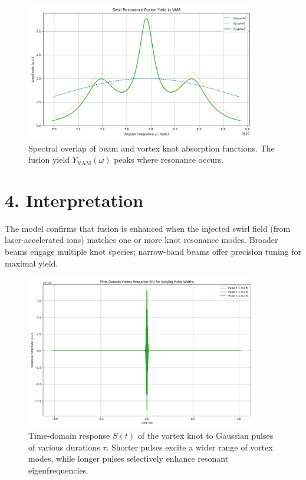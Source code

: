 \documentclass{article}
\begin{document}
\begin{figure}[h!]
  \centering
  \includegraphics[width=0.9\textwidth]{images/vam_swirl_yield_plot}
  \caption{Spectral overlap of beam and vortex knot absorption functions. The fusion yield $Y_{\mathrm{VAM}}(\omega)$ peaks where resonance occurs.}
\end{figure}

\section*{4. Interpretation}
The model confirms that fusion is enhanced when the injected swirl field (from laser-accelerated ions) matches one or more knot resonance modes. Broader beams engage multiple knot species; narrow-band beams offer precision tuning for maximal yield.

\begin{figure}[h!]
  \centering
  \includegraphics[width=0.9\textwidth]{images/vam_time_response_plot}
  \caption{Time-domain response $S(t)$ of the vortex knot to Gaussian pulses of various durations $\tau$. Shorter pulses excite a wider range of vortex modes, while longer pulses selectively enhance resonant eigenfrequencies.}
\end{figure}
\end{document}
